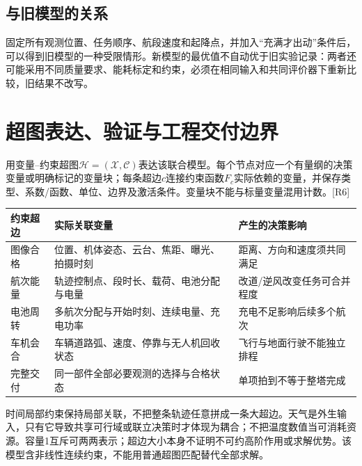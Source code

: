 \subsection{与旧模型的关系}
\noindent 固定所有观测位置、任务顺序、航段速度和起降点，并加入“充满才出动”条件后，可以得到旧模型的一种受限情形。新模型的最优值不自动优于旧实验记录：两者还可能采用不同质量要求、能耗标定和约束，必须在相同输入和共同评价器下重新比较，旧结果不改写。
\clearpage

\section{超图表达、验证与工程交付边界}
\noindent 用变量--约束超图$\mathcal H=(\mathcal X,\mathcal C)$表达该联合模型。每个节点对应一个有量纲的决策变量或明确标记的变量块；每条超边$c$连接约束函数$F_c$实际依赖的变量，并保存类型、系数/函数、单位、边界及激活条件。变量块不能与标量变量混用计数。[R6]
\begin{center}\small
\begin{tabular}{p{.20\linewidth}p{.47\linewidth}p{.23\linewidth}}\toprule
约束超边 & 实际关联变量 & 产生的决策影响\\\midrule
图像合格 & 位置、机体姿态、云台、焦距、曝光、拍摄时刻 & 距离、方向和速度须共同满足\\
航次能量 & 轨迹控制点、段时长、载荷、电池分配与电量 & 改道/逆风改变任务可合并程度\\
电池周转 & 多航次分配与开始时刻、连续电量、充电功率 & 充电不足影响后续多个航次\\
车机会合 & 车辆道路弧、速度、停靠与无人机回收状态 & 飞行与地面行驶不能独立排程\\
完整交付 & 同一部件全部必要观测的选择与合格状态 & 单项拍到不等于整塔完成\\\bottomrule
\end{tabular}
\end{center}
\noindent 时间局部约束保持局部关联，不把整条轨迹任意拼成一条大超边。天气是外生输入，只有它导致共享可行域或联立决策时才体现为耦合；不把温度数值当可消耗资源。容量1互斥可两两表示；超边大小本身不证明不可约高阶作用或求解优势。该模型含非线性连续约束，不能用普通超图匹配替代全部求解。

